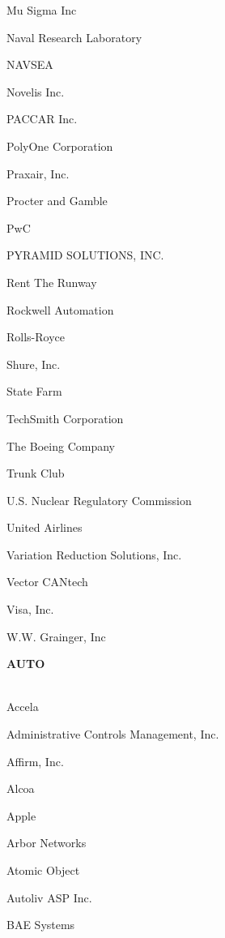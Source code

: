 \documentclass[twoside]{article}
\begin{document}
\begin{center}
\begin{multicols}{5}
\begin{FlushLeft}
\begin{compactitem}
\item Mu Sigma Inc
\item Naval Research Laboratory
\item NAVSEA
\item Novelis Inc.
\item PACCAR Inc.
\item PolyOne Corporation
\item Praxair, Inc.
\item Procter and Gamble
\item PwC
\item PYRAMID SOLUTIONS, INC.
\item Rent The Runway
\item Rockwell Automation
\item Rolls-Royce
\item Shure, Inc.
\item State Farm
\item TechSmith Corporation
\item The Boeing Company
\item Trunk Club
\item U.S. Nuclear Regulatory Commission
\item United Airlines
\item Variation Reduction Solutions, Inc.
\item Vector CANtech
\item Visa, Inc.
\item W.W. Grainger, Inc
\end{compactitem}
        \end{FlushLeft}
        \vspace{1em}
        {\fontsize{14}{16}\selectfont \bf AUTO}\\
        \vspace{-1em}
        ~\hrulefill~
        \vspace{-.9em}
        \begin{FlushLeft}
        \begin{compactitem}
        \item Accela
\item Administrative Controls Management, Inc.
\item Affirm, Inc.
\item Alcoa
\item Apple
\item Arbor Networks
\item Atomic Object
\item Autoliv ASP Inc.
\item BAE Systems

\end{compactitem}
\end{FlushLeft}
\end{multicols}
\end{center}
\end{document}
